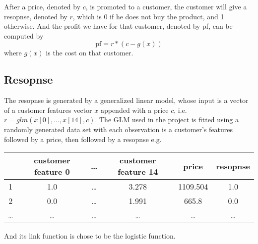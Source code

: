 \documentclass[11pt]{article}
\begin{document}
\noindent After a price, denoted by \(c\), is promoted to a customer, the 
customer will give a resopnse, denoted by \(r\), which is 0 if he does not buy
the product, and 1 otherwise. And the profit we have for that customer, 
denoted by pf, can be computed by
\[\text{pf} = r*\left(c - g(x)\right)\]
where \(g(x)\) is the cost on that customer.

\subsection{Resopnse}
The resopnse is generated by a generalized linear model, whose input is a 
vector of a customer features vector \(x\) appended with a price \(c\), i.e.
\(r=glm(x[0], \dots, x[14], c)\).
\vspace{3mm}\newline The GLM used in the project is fitted using a randomly
generated data set with each observation is a customer's features followed by 
a price, then followed by a resopnse e.g.
\begin{table}[htpb]
    \centering
    \begin{tabular}{c|c|c|c|c|c}
        & customer feature 0 & \dots & customer feature 14 & price & resopnse\\
        \hline
        1 & 1.0 & \dots & 3.278 & 1109.504 & 1.0\\
        \hline
        2 & 0.0 & \dots & 1.991 & 665.8 & 0.0\\
        \hline
        \dots & \dots & \dots & \dots & \dots & \dots
    \end{tabular}
\end{table}

\noindent And its link function is chose to be the logistic function.
\end{document}

